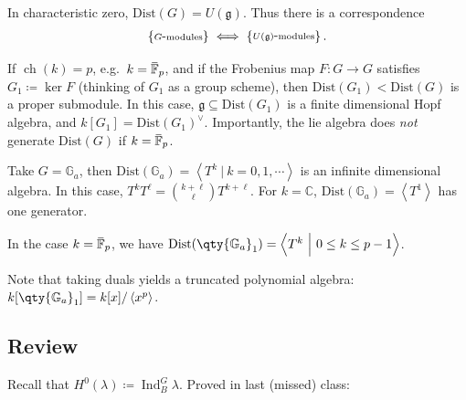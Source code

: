 \begin{remark}

In characteristic zero, \(\mathrm{Dist}(G) = U({\mathfrak{g}})\). Thus
there is a correspondence
\begin{align*}  
\left\{{\substack{G{\hbox{-}}\text{modules}}}\right\} \iff
\left\{{\substack{U({\mathfrak{g}}){\hbox{-}}\text{modules}}}\right\} 
.\end{align*}

If \(\operatorname{ch}(k) = p\),
e.g.~\(k = \mkern 1.5mu\overline{\mkern-1.5mu{\mathbb{F}}\mkern-1.5mu}\mkern 1.5mu_p\),
and if the Frobenius map \(F:G\to G\) satisfies \(G_1\coloneqq\ker F\)
(thinking of \(G_1\) as a group scheme), then
\(\mathrm{Dist}(G_1) < \mathrm{Dist}(G)\) is a proper submodule. In this
case, \({\mathfrak{g}}\subseteq \mathrm{Dist}(G_1)\) is a finite
dimensional Hopf algebra, and \(k[G_1] = \mathrm{Dist}(G_1)^\vee\).
Importantly, the lie algebra does \emph{not} generate
\(\mathrm{Dist}(G)\) if
\(k = \mkern 1.5mu\overline{\mkern-1.5mu{\mathbb{F}}\mkern-1.5mu}\mkern 1.5mu_p\).

\end{remark}

\begin{example}

Take \(G = {\mathbb{G}}_a\), then
\(\mathrm{Dist}({\mathbb{G}}_a) = \left\langle{T^k {~\mathrel{\Big|}~}k=0,1,\cdots}\right\rangle\)
is an infinite dimensional algebra. In this case,
\(T^k T^\ell = {k+\ell \choose \ell}T^{k+\ell}\). For
\(k={\mathbb{C}}\),
\(\mathrm{Dist}({\mathbb{G}}_a) = \left\langle{T^1}\right\rangle\) has
one generator.

In the case
\(k = \mkern 1.5mu\overline{\mkern-1.5mu{\mathbb{F}}\mkern-1.5mu}\mkern 1.5mu_p\),
we have
\(\mathrm{Dist}(\qty{{\mathbb{G}}_a}_1) = \left\langle{T^k {~\mathrel{\Big|}~}0\leq k \leq p-1}\right\rangle\).

Note that taking duals yields a truncated polynomial algebra:
\(k[\qty{{\mathbb{G}}_a}_1] = k[x] / \left\langle{x^p}\right\rangle\).

\end{example}

\hypertarget{review-1}{%
\subsection{Review}\label{review-1}}

Recall that \(H^0(\lambda) \coloneqq\operatorname{Ind}_B^G \lambda\).
Proved in last (missed) class:


